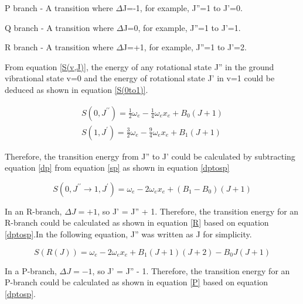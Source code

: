 \documentclass[twocolumn]{article} %
\let\tempthree\enumerate
\let\tempfour\endenumerate
\renewenvironment{enumerate}{\tempthree\setlength{\itemsep}{0pt}}{\tempfour}
\begin{document}
\begin{enumerate}
    \item P branch - A transition where $\Delta$J=-1, for example, J''=1 to J'=0.
    \item Q branch - A transition where $\Delta$J=0, for example, J''=1 to J'=1.
    \item R branch - A transition where $\Delta$J=+1, for example, J''=1 to J'=2.
\end{enumerate}


From equation \ref{S(v,J)}, the energy of any rotational state J'' in the ground vibrational state v=0 and the energy of rotational state J' in v=1 could be deduced as shown in equation \ref{S(0to1)}.

\begin{subequations}
    \label{S(0to1)}
    \begin{gather}
        S(0,J^{\prime \prime}) = \frac{1}{2}\omega_e - \frac{1}{4}\omega_ex_e + B_0(J + 1) \label{dp}\\
        S(1,J^{\prime}) = \frac{3}{2}\omega_e - \frac{9}{4}\omega_ex_e + B_1(J + 1) \label{sp}
    \end{gather}
\end{subequations}

Therefore, the transition energy from J'' to J' could be calculated by subtracting equation \ref{dp} from equation \ref{sp} as shown in equation \ref{dptosp}

\begin{equation}
    S(0,J^{\prime \prime} \rightarrow 1,J^{\prime}) = \omega_e - 2\omega_ex_e + (B_1 - B_0)(J + 1) \label{dptosp}
\end{equation}

In an R-branch, $\Delta J = +1$, so J' = J'' + 1. Therefore, the transition energy for an R-branch could be calculated as shown in equation \ref{R} based on equation \ref{dptosp}.In the following equation, J'' was written as J for simplicity.

\begin{equation}
    S(R(J)) = \omega_e - 2\omega_ex_e + B_1(J+1)(J+2) - B_0 J(J+1) \label{R}
\end{equation}

In a P-branch, $\Delta J = -1$, so J' = J'' - 1. Therefore, the transition energy for an P-branch could be calculated as shown in equation \ref{P} based on equation \ref{dptosp}.
\end{document}
